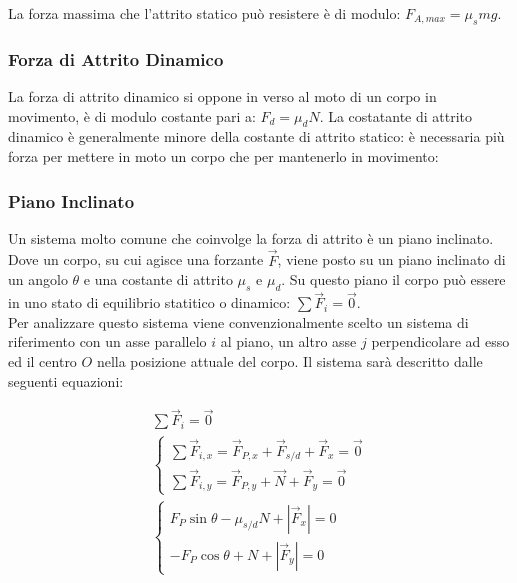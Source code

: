 \documentclass{article}
\numberwithin{equation}{subsection}
\begin{document}
La forza massima che l'attrito statico può resistere è 
di modulo: $F_{A,max}=\mu_smg$.

\subsubsection{Forza di Attrito Dinamico}
La forza di attrito dinamico si oppone in verso al moto di un corpo 
in movimento, è di modulo costante pari a: $F_d=\mu_dN$. La 
costatante di attrito dinamico è generalmente minore della 
costante di attrito statico: è necessaria più forza per 
mettere in moto un corpo che per mantenerlo in movimento:

\begin{center}\end{center}

\subsubsection{Piano Inclinato}
Un sistema molto comune che coinvolge la forza di attrito 
è un piano inclinato. Dove un corpo, su cui agisce una forzante 
$\vec{F}$, viene posto su un piano inclinato 
di un angolo $\theta$ e una costante di attrito $\mu_s$ e 
$\mu_d$. Su questo piano il corpo può essere in uno stato di 
equilibrio statitico o dinamico: $\sum\vec{F}_i=\vec{0}$.\\
Per analizzare questo sistema viene convenzionalmente scelto 
un sistema di riferimento con un asse parallelo $i$ al piano, 
un altro asse $j$ perpendicolare ad esso ed il centro $O$ 
nella posizione attuale del corpo.
Il sistema sarà descritto dalle seguenti equazioni:

\begin{gather*}
    \sum\vec{F}_i=\vec{0}\\
    \begin{cases}
        \sum\vec{F}_{i,x}=\vec{F}_{P,x}+\vec{F}_{s/d}+\vec{F}_x=\vec{0}\\
        \sum\vec{F}_{i,y}=\vec{F}_{P,y}+\vec{N}+\vec{F}_y=\vec{0}
    \end{cases}\\
    \begin{cases}
        F_P\sin\theta-\mu_{s/d}N+\left|\vec{F}_x\right|=0\\
        -F_P\cos\theta+N+\left|\vec{F}_y\right|=0
    \end{cases}
\end{gather*}
\end{document}
